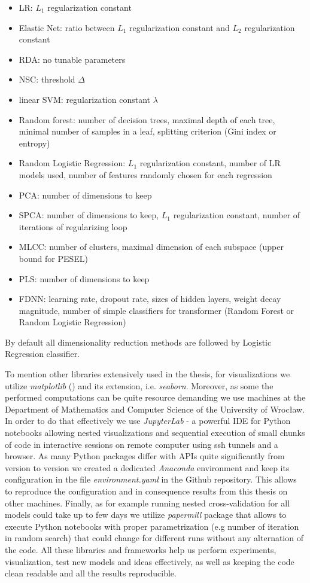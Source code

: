 \documentclass[shortabstract, english, mgr]{iithesis}
\begin{document}
\begin{itemize}
    \item LR: $L_1$ regularization constant
    \item Elastic Net: ratio between $L_1$ regularization constant and $L_2$ regularization constant
    \item RDA: no tunable parameters
    \item NSC: threshold $\Delta$
    \item linear SVM: regularization constant $\lambda$
    \item Random forest: number of decision trees, maximal depth of each tree, minimal number of samples in a leaf, splitting criterion (Gini index or entropy)
    \item Random Logistic Regression: $L_1$ regularization constant, number of LR models used, number of features randomly chosen for each regression 
    \item PCA: number of dimensions to keep
    \item SPCA: number of dimensions to keep, $L_1$ regularization constant, number of iterations of regularizing loop
    \item MLCC: number of clusters, maximal dimension of each subspace (upper bound for PESEL)
    \item PLS: number of dimensions to keep
    \item FDNN: learning rate, dropout rate, sizes of hidden layers, weight decay magnitude, number of simple classifiers for transformer (Random Forest or Random Logistic Regression)
\end{itemize}
By default all dimensionality reduction methods are followed by Logistic Regression classifier. 

To mention other libraries extensively used in the thesis, for visualizations we utilize \textit{matplotlib} (\cite{matplotlib}) and its extension, i.e. \textit{seaborn}. Moreover, as some the performed computations can be quite resource demanding we use machines at the Department of Mathematics and Computer Science of the University of Wrocław. In order to do that effectively we use \textit{JupyterLab} - a powerful IDE for Python notebooks allowing nested visualizations and sequential execution of small chunks of code in interactive sessions on remote computer using ssh tunnels and a browser. As many Python packages differ with APIs quite significantly from version to version we created a dedicated \textit{Anaconda} environment and keep its configuration in the file \textit{environment.yaml} in the Github repository. This allows to reproduce the configuration and in consequence results from this thesis on other machines. Finally, as for example running nested cross-validation for all models could take up to few days we utilize \textit{papermill} package that allows to execute Python notebooks with proper parametrization (e.g number of iteration in random search) that could change for different runs without any alternation of the code. All these libraries and frameworks help us perform experiments, visualization, test new models and ideas effectively, as well as keeping the code clean readable and all the results reproducible. 
\end{document}

